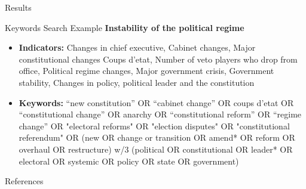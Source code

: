 \documentclass[aspectratio=169,10pt]{beamer}
\begin{document}
\begin{section}[Results]{Results}
\begin{frame}{Keywords Search Example}
\textbf{Instability of the political regime}
\scriptsize
\begin{itemize}
\item \textbf{Indicators:} Changes in chief executive, Cabinet changes, Major constitutional changes
Coups d’etat, Number of veto players who drop from office, Political regime changes, Major government crisis, Government stability, Changes in policy, political leader and the constitution
\item \textbf{Keywords:} “new constitution” OR “cabinet change” OR coups d’etat OR “constitutional change” OR anarchy OR “constitutional reform” OR “regime change” OR "electoral reforms" OR "election disputes" OR "constitutional referendum"  OR (new OR change or transition OR amend* OR reform OR overhaul OR restructure) w/3 (political OR constitutional OR leader* OR electoral OR systemic OR policy OR state OR government)

\end{itemize}
\hyperlink{keywords_search}{}
\end{frame}

\end{section}







\begin{frame}[allowframebreaks]{References}

\end{frame}
\end{document}

